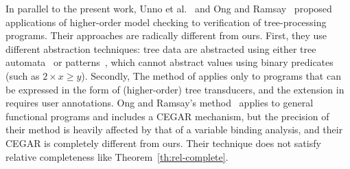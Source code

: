 In parallel to the present work, Unno et 
al.~\cite{Kobayashi2010,Unno2010} and Ong and Ramsay~\cite{Ong2011} 
proposed applications of higher-order model checking to verification of 
tree-processing programs. Their approaches are radically different from 
ours. First, they use different abstraction techniques: tree data are 
abstracted using either tree automata~\cite{Kobayashi2010,Unno2010} or 
patterns~\cite{Ong2011}, which cannot abstract values using binary 
predicates (such as \(2\times x\geq y\)). Secondly, The method of 
\cite{Kobayashi2010} applies only to programs that can be expressed in 
the form of (higher-order) tree transducers, and the extension in 
\cite{Unno2010} requires user annotations. Ong and Ramsay's 
method~\cite{Ong2011} applies to general functional programs and 
includes a CEGAR mechanism, but the precision of their method is heavily 
affected by that of a variable binding analysis, and their CEGAR is 
completely different from ours.
Their technique does not satisfy relative completeness like 
Theorem~\ref{th:rel-complete}.





